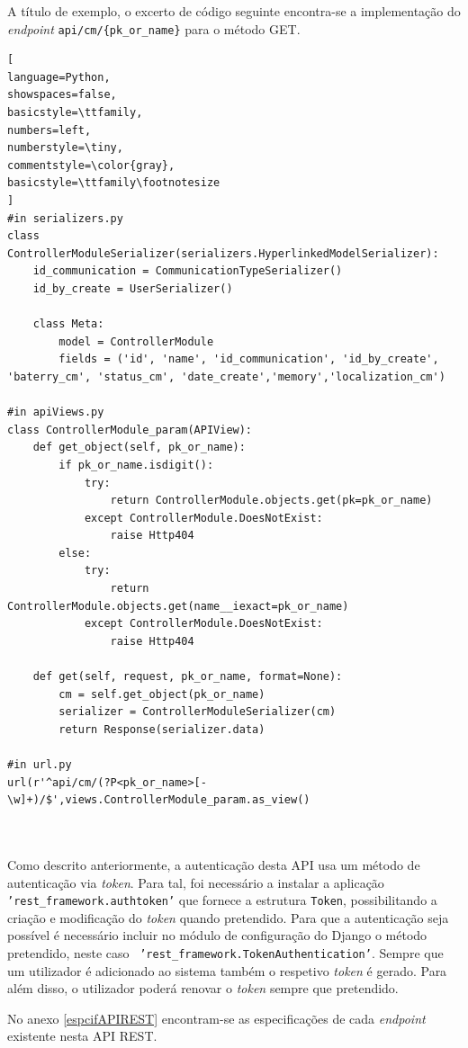  
A título de exemplo, o excerto de código seguinte encontra-se a implementação do \textit{endpoint} \texttt{api/cm/\{pk\_or\_name\}} para o método GET. 

\begin{lstlisting}[
language=Python,
showspaces=false,
basicstyle=\ttfamily,
numbers=left,
numberstyle=\tiny,
commentstyle=\color{gray},
basicstyle=\ttfamily\footnotesize
]
#in serializers.py
class ControllerModuleSerializer(serializers.HyperlinkedModelSerializer):
	id_communication = CommunicationTypeSerializer()
	id_by_create = UserSerializer()

	class Meta:
		model = ControllerModule
		fields = ('id', 'name', 'id_communication', 'id_by_create', 'baterry_cm', 'status_cm', 'date_create','memory','localization_cm')

#in apiViews.py 
class ControllerModule_param(APIView):
	def get_object(self, pk_or_name):
		if pk_or_name.isdigit():
			try:
				return ControllerModule.objects.get(pk=pk_or_name)
			except ControllerModule.DoesNotExist:
				raise Http404
		else:
			try:
				return ControllerModule.objects.get(name__iexact=pk_or_name)
			except ControllerModule.DoesNotExist:
				raise Http404
	
	def get(self, request, pk_or_name, format=None):
		cm = self.get_object(pk_or_name)
		serializer = ControllerModuleSerializer(cm)
		return Response(serializer.data)

#in url.py
url(r'^api/cm/(?P<pk_or_name>[-\w]+)/$',views.ControllerModule_param.as_view()



\end{lstlisting}



Como descrito anteriormente, a autenticação desta API usa um método de autenticação via \textit{token}. Para tal, foi necessário a instalar a aplicação \texttt{'rest\_framework.authtoken'} que fornece a estrutura \texttt{Token}, possibilitando a criação e modificação do \textit{token} quando pretendido. Para que a autenticação seja possível é necessário incluir no módulo de configuração do Django o método pretendido, neste caso  \ \texttt{'rest\_framework.TokenAuthentication'}. Sempre que um utilizador é adicionado ao sistema também o respetivo \textit{token} é gerado. Para além disso, o utilizador poderá renovar o \textit{token} sempre que pretendido. 

No anexo \ref{espcifAPIREST} encontram-se as especificações de cada \textit{endpoint} existente nesta API REST.






